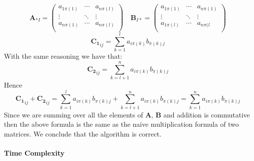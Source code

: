 \documentclass[10pt,a4paper]{article}
\begin{document}
 $$\mathbf{A}_{*I} = \begin{pmatrix}
 a_{1\pi(1)} & \cdots & a_{n\pi(l)}\\
 \vdots & \ddots & \vdots\\
 a_{n\pi(1)} & \cdots & a_{n\pi(l)}\\
 \end{pmatrix}
 \quad 
 \mathbf{B}_{I*} = \begin{pmatrix}
 a_{1\pi(1)} & \cdots & a_{n\pi(1)}\\
 \vdots & \ddots & \vdots\\
 a_{1\pi(l)} & \cdots & a_{n\pi(l}\\
 \end{pmatrix}
 $$
 $$
 \mathbf{C_1}_{ij} = \sum ^l _{k=1} a_{i\pi(k)}b_{\pi(k)j}
 $$
 With the same reasoning we have that:
  $$
 \mathbf{C_2}_{ij} = \sum ^n _{k=l+1} a_{i\pi(k)}b_{\pi(k)j}
 $$
Hence   $$\mathbf{C_1}_{ij} +  \mathbf{C_2}_{ij} = \sum ^l _{k=1} a_{i\pi(k)}b_{\pi(k)j} + \sum ^n _{k=l+1} a_{i\pi(k)}b_{\pi(k)j} = \sum ^n _{k=1} a_{i\pi(k)}b_{\pi(k)j}
$$
Since we are summing over all the elements of $\mathbf{A},\, \mathbf{B}$ and addition is commutative then the above formula is the same as the naive multiplication formula of two matrices. We conclude that the algorithm is correct.\\\\
\textbf{Time Complexity}
\end{document}

